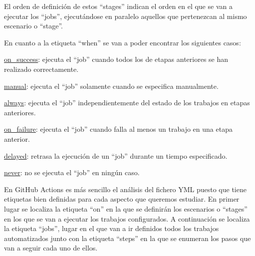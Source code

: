 El orden de definición de estos ``stages'' indican el orden en el que se van a ejecutar los ``jobs'', ejecutándose en paralelo aquellos que pertenezcan al mismo escenario o ``stage''.

En cuanto a la etiqueta ``when'' se van a poder encontrar los siguientes casos:
\begin{compactitem}
    \item \underline{on\_success}: ejecuta el ``job'' cuando todos los de etapas anteriores se han realizado correctamente.
    \item \underline{manual}: ejecuta el ``job'' solamente cuando se especifica manualmente.
    \item \underline{always}: ejecuta el ``job'' independientemente del estado de los trabajos en etapas anteriores.
    \item \underline{on\_failure}: ejecuta el ``job'' cuando falla al menos un trabajo en una etapa anterior.
    \item \underline{delayed}: retrasa la ejecución de un ``job'' durante un tiempo especificado.
    \item \underline{never}: no se ejecuta el ``job'' en ningún caso.
\end{compactitem}

En GitHub Actions es más sencillo el análisis del fichero YML puesto que tiene etiquetas bien definidas para cada aspecto que queremos estudiar. En primer lugar se localiza la etiqueta ``on'' en la que se definirán los escenarios o ``stages'' en los que se van a ejecutar los trabajos configurados. A continuación se localiza la etiqueta ``jobs'', lugar en el que van a ir definidos todos los trabajos automatizados junto con la etiqueta ``steps'' en la que se enumeran los pasos que van a seguir cada uno de ellos.

